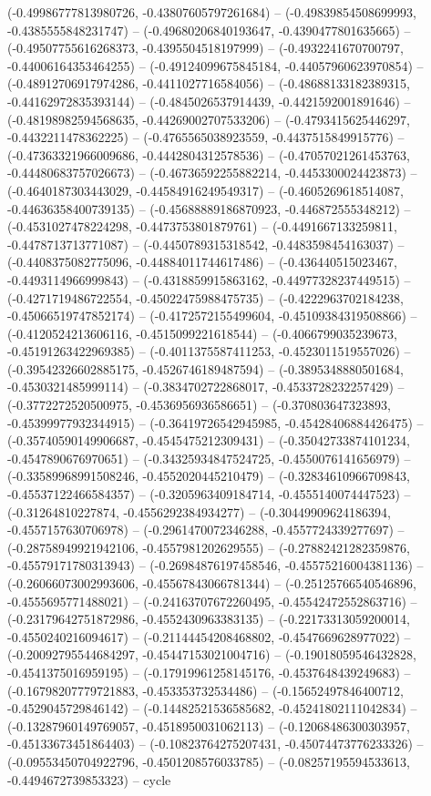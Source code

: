 (-0.49986777813980726, -0.43807605797261684) -- (-0.49839854508699993, -0.4385555848231747) -- (-0.49680206840193647, -0.4390477801635665) -- (-0.49507755616268373, -0.4395504518197999) -- (-0.4932241670700797, -0.44006164353464255) -- (-0.49124099675845184, -0.44057960623970854) -- (-0.48912706917974286, -0.4411027716584056) -- (-0.48688133182389315, -0.44162972835393144) -- (-0.4845026537914439, -0.4421592001891646) -- (-0.48198982594568635, -0.44269002707533206) -- (-0.4793415625446297, -0.4432211478362225) -- (-0.4765565038923559, -0.4437515849915776) -- (-0.47363321966009686, -0.4442804312578536) -- (-0.47057021261453763, -0.44480683757026673) -- (-0.46736592255882214, -0.4453300024423873) -- (-0.4640187303443029, -0.44584916249549317) -- (-0.4605269618514087, -0.44636358400739135) -- (-0.45688889186870923, -0.446872555348212) -- (-0.4531027478224298, -0.4473753801879761) -- (-0.4491667133259811, -0.4478713713771087) -- (-0.4450789315318542, -0.4483598454163037) -- (-0.4408375082775096, -0.44884011744617486) -- (-0.436440515023467, -0.4493114966999843) -- (-0.4318859915863162, -0.44977328237449515) -- (-0.4271719486722554, -0.45022475988475735) -- (-0.4222963702184238, -0.45066519747852174) -- (-0.4172572155499604, -0.45109384319508866) -- (-0.4120524213606116, -0.4515099221618544) -- (-0.4066799035239673, -0.45191263422969385) -- (-0.4011375587411253, -0.4523011519557026) -- (-0.39542326602885175, -0.4526746189487594) -- (-0.3895348880501684, -0.4530321485999114) -- (-0.3834702722868017, -0.4533728232257429) -- (-0.3772272520500975, -0.4536956936586651) -- (-0.370803647323893, -0.45399977932344915) -- (-0.36419726542945985, -0.45428406884426475) -- (-0.35740590149906687, -0.4545475212309431) -- (-0.35042733874101234, -0.4547890676970651) -- (-0.34325934847524725, -0.4550076141656979) -- (-0.33589968991508246, -0.4552020445210479) -- (-0.32834610966709843, -0.45537122466584357) -- (-0.3205963409184714, -0.4555140074447523) -- (-0.31264810227874, -0.4556292384934277) -- (-0.30449909624186394, -0.4557157630706978) -- (-0.2961470072346288, -0.4557724339277697) -- (-0.28758949921942106, -0.4557981202629555) -- (-0.27882421282359876, -0.45579171780313943) -- (-0.26984876197458546, -0.45575216004381136) -- (-0.26066073002993606, -0.45567843066781344) -- (-0.25125766540546896, -0.4555695771488021) -- (-0.24163707672260495, -0.45542472552863716) -- (-0.23179642751872986, -0.4552430963383135) -- (-0.22173313059200014, -0.4550240216094617) -- (-0.21144454208468802, -0.4547669628977022) -- (-0.20092795544684297, -0.45447153021004716) -- (-0.19018059546432828, -0.4541375016959195) -- (-0.17919961258145176, -0.4537648439249683) -- (-0.16798207779721883, -0.453353732534486) -- (-0.15652497846400712, -0.4529045729846142) -- (-0.14482521536585682, -0.45241802111042834) -- (-0.13287960149769057, -0.4518950031062113) -- (-0.12068486300303957, -0.45133673451864403) -- (-0.10823764275207431, -0.45074473776233326) -- (-0.09553450704922796, -0.4501208576033785) -- (-0.08257195594533613, -0.4494672739853323) -- cycle
